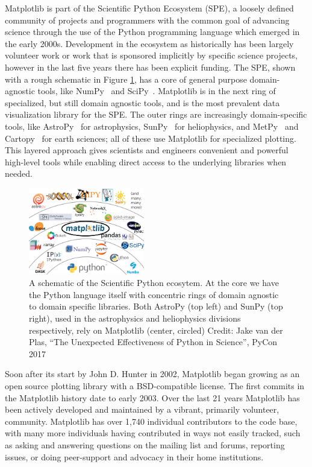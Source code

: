 \documentclass[12pt]{article}
\numberwithin{page}{section}
\begin{document}
Matplotlib is part of the Scientific Python Ecosystem (SPE), a loosely defined
community of projects and programmers with the common goal of advancing science
through the use of the Python programming language which emerged in the early
2000s.  Development in the ecosystem as historically has been largely volunteer
work or work that is sponsored implicitly by specific science projects, however
in the last five years there has been explicit funding.  The SPE, shown with a
rough schematic in Figure \ref{fig:ecosystem}, has a core of general purpose
domain-agnostic tools, like NumPy~\cite{Harris2020} and
SciPy~\cite{Virtanen2020}.  Matplotlib is in the next ring of specialized, but
still domain agnostic tools, and is the most prevalent data visualization
library for the SPE.  The outer rings are increasingly domain-specific tools,
like AstroPy~\cite{astropy:2013, astropy:2018} for astrophysics,
SunPy~\cite{sunpy_community2020} for heliophysics, and MetPy~\cite{metpy} and
Cartopy~\cite{Cartopy} for earth sciences; all of these use Matplotlib for
specialized plotting.
This layered approach gives scientists and engineers
convenient and powerful high-level tools while enabling direct access to the
underlying libraries when needed.


\begin{figure}
  \includegraphics[width=0.45\textwidth]{scipy-ecosystem}
  \caption{\small A schematic of the Scientific Python ecosytem.  At the
    core we have the Python language itself with concentric rings of
    domain agnostic to domain specific libraries.  Both AstroPy (top
    left) and SunPy (top right), used in the astrophysics and
    heliophysics divisions respectively, rely on Matplotlib (center, circled)
    Credit: Jake van der Plas, ``The Unexpected Effectiveness of Python
    in Science'', PyCon 2017}
  \label{fig:ecosystem}
\end{figure}


Soon after its start by John D. Hunter in 2002, Matplotlib began growing as an
open source plotting library with a BSD-compatible license. The first commits
in the Matplotlib history date to early 2003.  Over the last 21 years
Matplotlib has been actively developed and maintained by a vibrant, primarily
volunteer, community.  Matplotlib has over 1,740 individual contributors to the
code base, with many more individuals having contributed in ways not easily
tracked, such as asking and answering questions on the mailing list and forums,
reporting issues, or doing peer-support and advocacy in their home
institutions.
\end{document}
